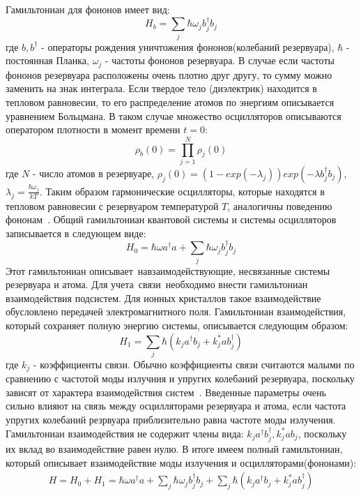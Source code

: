 Гамильтониан для фононов имеет вид:
\begin{equation}
    H_{b} = \sum_{j} \hbar \omega_{j} b_{j}^{\dagger} b_{j}
\end{equation}
где $b, b^{\dagger}$ - операторы рождения уничтожения фононов(колебаний резервуара), $\hbar$ - постоянная
Планка, $\omega_{j}$ - частоты фононов резервуара.
В случае если частоты фононов резервуара расположены очень плотно друг другу, то сумму можно заменить
на знак интеграла.
Если твердое тело (диэлектрик) находится в тепловом равновесии, то его распределение атомов по энергиям
описывается уравнением Больцмана.
В таком случае множество осцилляторов описываются оператором плотности в момент времени $t = 0$:
\begin{equation}
    \rho_{b} (0) = \prod_{j=1}^{N} \rho_{j} (0)
\end{equation}
где $N$ - число атомов в резервуаре, $\rho_{j} (0) = (1-exp(-\lambda_{j})) exp(-\lambda b_{j}^{\dagger} b_{j})$,
$\lambda_{j} = \frac{\hbar \omega_{j}}{kT}$.
Таким образом гармонические осцилляторы, которые находятся в тепловом равновесии с резервуаром
температурой $T$, аналогичны поведению фононам~\citep{barnett2002methods}.
Общий гамильтониан квантовой системы и системы осцилляторов записывается в следующем виде:
\begin{equation}
    H_{0} = \hbar \omega a^{\dagger} a + \sum_{j} \hbar \omega_{j} b_{j}^{\dagger} b_{j}
\end{equation}
Этот гамильтониан описывает~навзаимодействующие, несвязанные системы резервуара и атома.
Для учета~связи~необходимо внести гамильтониан взаимодействия подсистем.
Для ионных кристаллов такое взаимодействие обусловлено передачей электромагнитного поля.
Гамильтониан взаимодействия, который сохраняет полную энергию системы, описывается следующим образом:
\begin{equation}
    H_{1} = \sum_{j} \hbar (k_{j} a^{\dagger} b_{j} + k_{j}^{*} a b_{j}^{\dagger})
\end{equation}
где $k_{j}$ - коэффициенты связи.
Обычно коэффициенты связи считаются малыми по сравнению с частотой моды излучния и упругих колебаний
резервуара, поскольку зависят от характера взаимодействия систем~\citep{barnett2002methods}.
Введенные параметры очень сильно влияют на связь между осцилляторами резервуара и атома, если частота
упругих колебаний резрвуара приблизительно равна частоте моды излучения.
Гамильтониан взаимодействия не содержит члены вида: $k_{j} a^{\dagger} b_{j}^{\dagger}, k_{j}^{*} a b_{j}$,
поскольку их вклад во взаимодействие равен нулю.
В итоге имеем полный гамильтониан, который описывает взаимодействие моды излучения и осцилляторами(фононами):
\begin{multline}
    H = H_{0} + H_{1} = \hbar \omega a^{\dagger} a + \sum_{j} \hbar \omega_{j} b_{j}^{\dagger} b_{j} +
    \sum_{j} \hbar (k_{j} a^{\dagger} b_{j} + k_{j}^{*} a b_{j}^{\dagger})
\end{multline}

